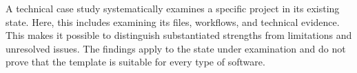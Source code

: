 \begin{beginnerstatement}

A technical case study systematically examines a specific project in its
existing state. Here, this includes examining its files, workflows, and
technical evidence. This makes it possible to distinguish substantiated
strengths from limitations and unresolved issues. The findings apply to the
state under examination and do not prove that the template is suitable for
every type of software.

\end{beginnerstatement}
